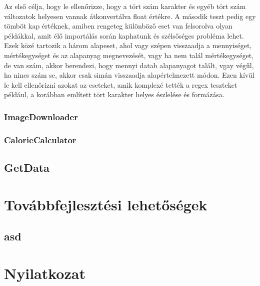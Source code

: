 \documentclass[12pt]{report}
\theoremstyle{definition}
\begin{document}
Az első célja, hogy le ellenőrizze, hogy a tört szám karakter és egyéb tört szám változatok helyesen vannak átkonvertálva float értékre. A második teszt pedig egy tömböt kap értéknek, amiben rengeteg különböző eset van felsorolva olyan példákkal, amit élő importálás során kaphatunk és szélsőséges probléma lehet. Ezek közé tartozik a három alapeset, ahol vagy szépen visszaadja a mennyiséget, mértékegységet és az alapanyag megnevezését, vagy ha nem talál mértékegységet, de van szám, akkor berendezi, hogy mennyi datab alapanyagot talált, vgay végűl, ha nincs szám se, akkor csak simán visszaadja alapértelmezett módon. Ezen kívül le kell ellenőrizni azokat az eseteket, amik komplexé tették a regex teszteket például, a korábban említett tört karakter helyes észlelése és formázása.

\subsection{ImageDownloader}

\subsection{CalorieCalculator}

\section{GetData}

\chapter{Továbbfejlesztési lehetőségek}
\section{asd}



\chapter*{Nyilatkozat}

\end{document}
